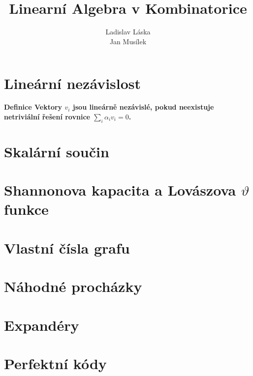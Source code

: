 \documentclass[a4paper,12pt,titlepage]{article}
\title{Linearní Algebra v Kombinatorice}
\author{Ladislav Láska\\ Jan Musílek}
\newcommand{\df}{\smallskip\noindent\bf Definice\rm{} }
\begin{document}
\maketitle
\newpage
\tableofcontents
\newpage


\section{Lineární nezávislost}

\df Vektory $v_i$ jsou lineárně nezávislé, pokud neexistuje netriviální řešení 
rovnice $\sum_i \alpha_iv_i=0$.







\section{Skalární součin}





\section{Shannonova kapacita a Lovászova $\vartheta$ funkce}





\section{Vlastní čísla grafu}







\section{Náhodné procházky}





\section{Expandéry}






\section{Perfektní kódy}
\end{document}
